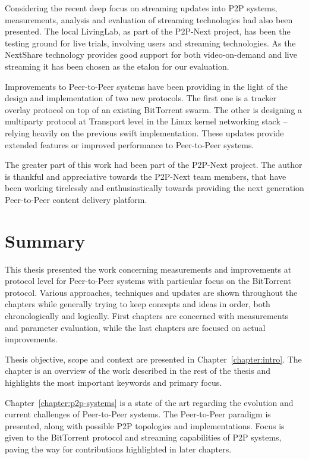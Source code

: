 Considering the recent deep focus on streaming updates into P2P systems,
measurements, analysis and evaluation of streaming technologies had also been
presented. The local LivingLab, as part of the P2P-Next project, has been the
testing ground for live trials, involving users and streaming technologies. As
the NextShare technology provides good support for both video-on-demand and
live streaming it has been chosen as the etalon for our evaluation.

Improvements to Peer-to-Peer systems have been providing in the light of the
design and implementation of two new protocols. The first one is a tracker
overlay protocol on top of an existing BitTorrent swarm. The other is
designing a multiparty protocol at Transport level in the Linux kernel
networking stack -- relying heavily on the previous swift implementation.
These updates provide extended features or improved performance to
Peer-to-Peer systems.

The greater part of this work had been part of the P2P-Next project. The
author is thankful and appreciative towards the P2P-Next team members, that
have been working tirelessly and enthusiastically towards providing the next
generation Peer-to-Peer content delivery platform.

\section{Summary}
\label{sec:conclusion:summary}

This thesis presented the work concerning measurements and improvements at
protocol level for Peer-to-Peer systems with particular focus on the
BitTorrent protocol. Various approaches, techniques and updates are shown
throughout the chapters while generally trying to keep concepts and ideas in
order, both chronologically and logically. First chapters are concerned with
measurements and parameter evaluation, while the last chapters are focused on
actual improvements.

Thesis objective, scope and context are presented in
Chapter~\ref{chapter:intro}. The chapter is an overview of the work described
in the rest of the thesis and highlights the most important keywords and
primary focus.

Chapter~\ref{chapter:p2p-systems} is a state of the art regarding the
evolution and current challenges of Peer-to-Peer systems. The Peer-to-Peer
paradigm is presented, along with possible P2P topologies and implementations.
Focus is given to the BitTorrent protocol and streaming capabilities of P2P
systems, paving the way for contributions highlighted in later chapters.

